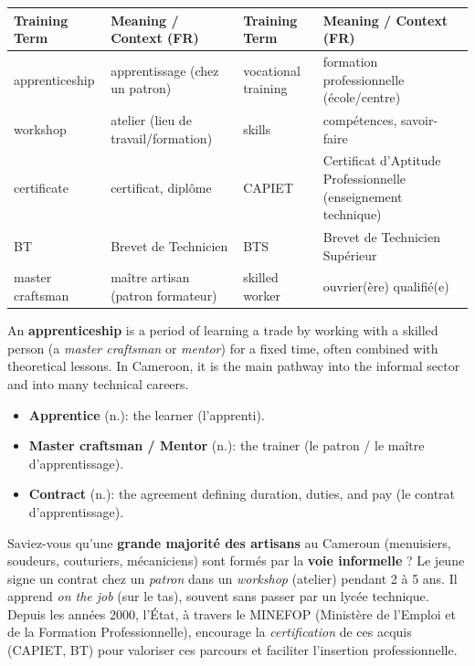 \documentclass[11pt]{article}
\begin{document}
\begin{center}
\begin{tabularx}{\linewidth}{|l|X|l|X|}
\hline
\rowcolor{poporangeL}
\textbf{Training Term} & \textbf{Meaning / Context (FR)} & \textbf{Training Term} & \textbf{Meaning / Context (FR)} \\
\hline
apprenticeship & apprentissage (chez un patron) & vocational training & formation professionnelle (école/centre) \\
workshop & atelier (lieu de travail/formation) & skills & compétences, savoir-faire \\
certificate & certificat, diplôme & CAPIET & Certificat d'Aptitude Professionnelle (enseignement technique) \\
BT & Brevet de Technicien & BTS & Brevet de Technicien Supérieur \\
master craftsman & maître artisan (patron formateur) & skilled worker & ouvrier(ère) qualifié(e) \\
\hline
\end{tabularx}
\end{center}

\begin{definition}[Apprenticeship]
An \textbf{apprenticeship} is a period of learning a trade by working with a skilled person (a \emph{master craftsman} or \emph{mentor}) for a fixed time, often combined with theoretical lessons. In Cameroon, it is the main pathway into the informal sector and into many technical careers.
\begin{itemize}
    \item \textbf{Apprentice} (n.): the learner (l'apprenti).
    \item \textbf{Master craftsman / Mentor} (n.): the trainer (le patron / le maître d'apprentissage).
    \item \textbf{Contract} (n.): the agreement defining duration, duties, and pay (le contrat d'apprentissage).
\end{itemize}
\end{definition}

\begin{savaistu}
Saviez-vous qu'une \textbf{grande majorité des artisans} au Cameroun (menuisiers, soudeurs, couturiers, mécaniciens) sont formés par la \textbf{voie informelle} ? Le jeune signe un contrat chez un \emph{patron} dans un \emph{workshop} (atelier) pendant 2 à 5 ans. Il apprend \emph{on the job} (sur le tas), souvent sans passer par un lycée technique. Depuis les années 2000, l'État, à travers le MINEFOP (Ministère de l'Emploi et de la Formation Professionnelle), encourage la \emph{certification} de ces acquis (CAPIET, BT) pour valoriser ces parcours et faciliter l'insertion professionnelle.
\end{savaistu}
\end{document}
